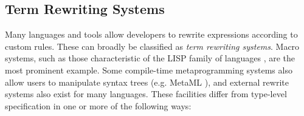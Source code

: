 \documentclass{llncs}
\begin{document}

\subsection{Term Rewriting Systems}
Many languages and tools allow developers to rewrite expressions according to custom rules. These can broadly be classified as {\it term rewriting systems}. Macro systems, such as those characteristic of the LISP family of languages \cite{mccarthy1978history}, are the most prominent example. Some compile-time metaprogramming systems also allow users to manipulate syntax trees (e.g. MetaML \cite{Sheard:1999:UMS}), and external rewrite systems also exist for many languages.
These facilities differ from type-level specification in one or more of the following ways:
\end{document}
